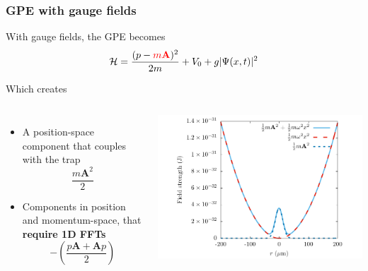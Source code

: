 \documentclass{beamer}
\begin{document}
\begin{frame}
\frametitle{GPE with gauge fields}
With gauge fields, the GPE becomes
\begin{equation*}
\mathcal{ H} = \frac{(p-{\color{red}{m\mathbf{A}}} )^2}{2m} + V_0 + g|\Psi(x,t)|^2
\end{equation*}

Which creates

\begin{columns}
\begin{itemize}
\item A position-space component that couples with the trap
$$
\frac{m\mathbf{A}^2}{2}
$$

\item Components in position and momentum-space, that \textbf{require 1D FFTs}
$$
-\left(\frac{p\mathbf{A} + \mathbf{A}p}{2}\right)
$$
\end{itemize}
\includegraphics[width=1.1\textwidth]{../data/splitop/gauge/check.pdf}
\end{columns}

\end{frame}
\end{document}
